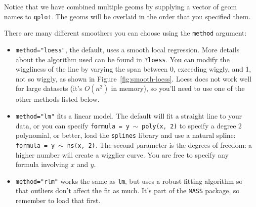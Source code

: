 % 


Notice that we have combined multiple geoms by supplying a vector of geom names to {\tt qplot}.  The geoms will be overlaid in the order that you specified them.

There are many different smoothers you can choose using the {\tt method} argument:

\begin{itemize}
	\item {\tt method="loess"}, the default, uses a smooth local regression.  More details about the algorithm used can be found in {\tt ?loess}.  You can modify the wiggliness of the line by varying the span between 0, exceeding wiggly, and 1, not so wiggly, as shown in Figure~\ref{fig:smooth-loess}.  Loess does not work well for large datasets (it's $O(n^2)$ in memory), so you'll need to use one of the other methods listed below.

    

	\item {\tt method="lm"} fits a linear model.  The default will fit a straight line to your data, or you can specify {\tt formula = y $\sim$ poly(x, 2)} to specify a degree 2 polynomial, or better, load the {\tt splines} library and use a natural spline: {\tt formula = y $\sim$ ns(x, 2)}. The second parameter is the degrees of freedom: a higher number will create a wigglier curve. You are free to specify any formula involving $x$ and $y$.  

  

	\item {\tt method="rlm"} works the same as {\tt lm}, but uses a robust fitting algorithm so that outliers don't affect the fit as much.  It's part of the {\tt MASS} package, so remember to load that first.


\end{itemize}
